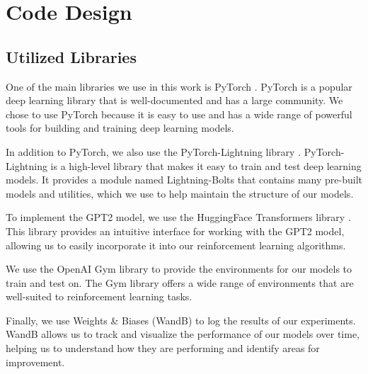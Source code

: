 
\section{Code Design}

\subsection{Utilized Libraries}


One of the main libraries we use in this work is PyTorch \cite{paszke2019pytorch}. PyTorch is a popular deep learning library that is well-documented and has a large community. We chose to use PyTorch because it is easy to use and has a wide range of powerful tools for building and training deep learning models.

In addition to PyTorch, we also use the PyTorch-Lightning library \cite{falcon2019pytorch}. PyTorch-Lightning is a high-level library that makes it easy to train and test deep learning models. It provides a module named Lightning-Bolts that contains many pre-built models and utilities, which we use to help maintain the structure of our models.

To implement the GPT2 model, we use the HuggingFace Transformers library \cite{wolf2019huggingface}. This library provides an intuitive interface for working with the GPT2 model, allowing us to easily incorporate it into our reinforcement learning algorithms.

We use the OpenAI Gym library \cite{brockman2016openai} to provide the environments for our models to train and test on. The Gym library offers a wide range of environments that are well-suited to reinforcement learning tasks.

Finally, we use Weights \& Biases (WandB) \cite{wandb} to log the results of our experiments. WandB allows us to track and visualize the performance of our models over time, helping us to understand how they are performing and identify areas for improvement.

